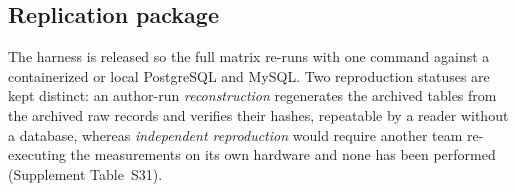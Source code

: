 \subsection{Replication package}
The harness is released so the full matrix re-runs with one command against a containerized or local PostgreSQL and MySQL.
Two reproduction statuses are kept distinct: an author-run \emph{reconstruction} regenerates the archived tables from the archived raw records and verifies their hashes, repeatable by a reader without a database, whereas \emph{independent reproduction} would require another team re-executing the measurements on its own hardware and none has been performed (Supplement Table~S31).
